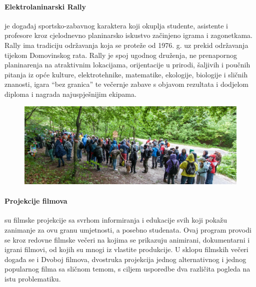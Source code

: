 \documentclass[12pt,a4paper,oneside]{article}
\begin{document}
	\paragraph{Elektrolaninarski Rally}je događaj sportsko-zabavnog karaktera koji okuplja studente, asistente i profesore kroz cjelodnevno planinarsko iskustvo začinjeno igrama i zagonetkama. Rally ima tradiciju održavanja koja se proteže od 1976. g. uz prekid održavanja tijekom Domovinskog rata. Rally je spoj ugodnog druženja, ne prenapornog planinarenja na atraktivnim lokacijama, orijentacije u prirodi, šaljivih i poučnih pitanja iz opće kulture, elektrotehnike, matematike, ekologije, biologije i sličnih znanosti, igara “bez granica” te večernje zabave s objavom rezultata i dodjelom diploma i nagrada najuspješnijim ekipama.
	
	\begin{figure}[h!]
		\centering
		\vspace{5mm}
		\includegraphics[scale=0.28]{rally1.jpg}	
	\end{figure}
	
	\paragraph{Projekcije filmova}su filmske projekcije sa svrhom informiranja i edukacije svih koji pokažu zanimanje za ovu granu umjetnosti, a posebno studenata. Ovaj program provodi se kroz redovne filmske večeri na kojima se prikazuju animirani, dokumentarni i igrani filmovi, od kojih su mnogi iz vlastite produkcije. U sklopu filmskih večeri događa se i Dvoboj filmova, dvostruka projekcija jednog alternativnog i jednog popularnog filma sa sličnom temom, s ciljem usporedbe dva različita pogleda na istu problematiku.
	
\end{document}
